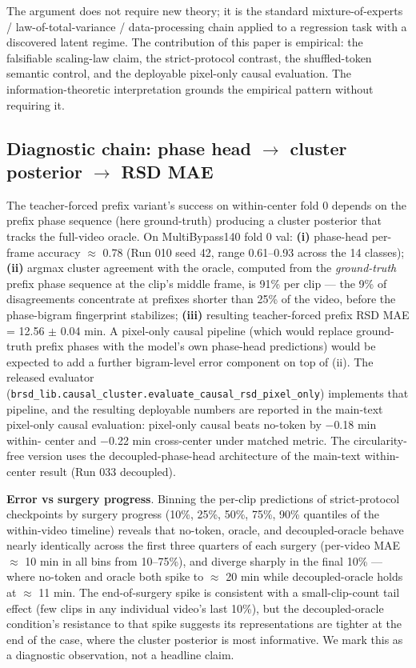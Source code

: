 The argument does not require new theory; it is the standard
mixture-of-experts / law-of-total-variance / data-processing chain
applied to a regression task with a discovered latent regime. The
contribution of this paper is empirical: the falsifiable scaling-law
claim, the strict-protocol contrast, the shuffled-token semantic
control, and the deployable pixel-only causal evaluation. The
information-theoretic interpretation grounds the empirical pattern
without requiring it.

\subsection{Diagnostic chain: phase head $\rightarrow$ cluster posterior $\rightarrow$ RSD MAE}\label{diagnostic-chain-phase-head-cluster-posterior-rsd-mae}

The teacher-forced prefix variant's success on within-center fold 0
depends on the prefix phase sequence (here ground-truth) producing a
cluster posterior that tracks the full-video oracle. On MultiBypass140
fold 0 val: \textbf{(i)} phase-head per-frame accuracy $\approx$ 0.78 (Run 010
seed 42, range 0.61--0.93 across the 14 classes); \textbf{(ii)} argmax
cluster agreement with the oracle, computed from the \emph{ground-truth}
prefix phase sequence at the clip's middle frame, is 91\% per clip ---
the 9\% of disagreements concentrate at prefixes shorter than 25\% of
the video, before the phase-bigram fingerprint stabilizes;
\textbf{(iii)} resulting teacher-forced prefix RSD MAE = 12.56 $\pm$ 0.04
min. A pixel-only causal pipeline (which would replace ground-truth
prefix phases with the model's own phase-head predictions) would be
expected to add a further bigram-level error component on top of (ii).
The released evaluator
(\texttt{brsd\_lib.causal\_cluster.evaluate\_causal\_rsd\_pixel\_only})
implements that pipeline, and the resulting deployable numbers are
reported in the main-text pixel-only causal evaluation: pixel-only causal beats no-token by $-$0.18 min within-
center and $-$0.22 min cross-center under matched metric. The
circularity-free version uses the decoupled-phase-head architecture of
the main-text within-center result (Run 033 decoupled).

\textbf{Error vs surgery progress}. Binning the per-clip
predictions of strict-protocol checkpoints by surgery progress (10\%,
25\%, 50\%, 75\%, 90\% quantiles of the within-video timeline) reveals
that no-token, oracle, and decoupled-oracle behave nearly identically
across the first three quarters of each surgery (per-video MAE $\approx$ 10 min
in all bins from 10--75\%), and diverge sharply in the final 10\% ---
where no-token and oracle both spike to $\approx$ 20 min while decoupled-oracle
holds at $\approx$ 11 min. The end-of-surgery spike is consistent with a
small-clip-count tail effect (few clips in any individual video's last
10\%), but the decoupled-oracle condition's resistance to that spike
suggests its representations are tighter at the end of the case, where
the cluster posterior is most informative. We mark this as a diagnostic
observation, not a headline claim.

